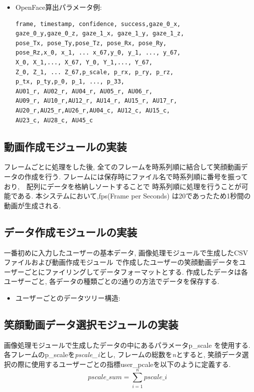 \begin{itemize}
\item OpenFace算出パラメータ例:
\begin{lstlisting}
frame, timestamp, confidence, success,gaze_0_x,
gaze_0_y,gaze_0_z, gaze_1_x, gaze_1_y, gaze_1_z,
pose_Tx, pose_Ty,pose_Tz, pose_Rx, pose_Ry,
pose_Rz,x_0, x_1, ... x_67,y_0, y_1, ..., y_67,
X_0, X_1,..., X_67, Y_0, Y_1,..., Y_67,
Z_0, Z_1, ... Z_67,p_scale, p_rx, p_ry, p_rz,
p_tx, p_ty,p_0, p_1, ..., p_33,
AU01_r, AU02_r, AU04_r, AU05_r, AU06_r,
AU09_r, AU10_r,AU12_r, AU14_r, AU15_r, AU17_r,
AU20_r,AU25_r,AU26_r,AU04_c, AU12_c, AU15_c,
AU23_c, AU28_c, AU45_c
\end{lstlisting}
\end{itemize}

\subsection{動画作成モジュールの実装}
フレームごとに処理をした後, 全てのフレームを時系列順に結合して笑顔動画データの作成を行う.
フレームには保存時にファイル名で時系列順に番号を振っており,　配列にデータを格納しソートすることで
時系列順に処理を行うことが可能である.
本システムにおいて,fps(Frame per Seconds) は20であったため1秒間の動画が生成される.

\subsection{データ作成モジュールの実装}
一番初めに入力したユーザーの基本データ, 画像処理モジュールで生成したCSVファイルおよび動画作成モジュール
で作成したユーザーの笑顔動画データをユーザーごとにファイリングしてデータフォーマットとする.
作成したデータは各ユーザーごと, 各データの種類ごとの2通りの方法でデータを保存する.

\begin{itemize}
\item ユーザーごとのデータツリー構造:
\end{itemize}

\subsection{笑顔動画データ選択モジュールの実装}
画像処理モジュールで生成したデータの中にあるパラメータp\_scale を使用する.
各フレームのp\_scaleを{\sl pscale\_i}とし, フレームの総数を{\sl n}とすると,
笑顔データ選択の際に使用するユーザーごとの指標user\_pcaleを以下のように定義する.
\begin{equation}
\label{pscalesum}
pscale\_sum = \sum_{i=1}^ n pscale\_i
\end{equation}

